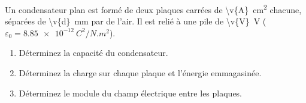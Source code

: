 Un condensateur plan est formé de deux plaques carrées de \qty{\v{A}}{cm^2} chacune, séparées de \qty{\v{d}}{mm} par de l'air. Il est relié à une pile de \qty{\v{V}}{V} ($\varepsilon_0 = \qty{8.85e-12}{C^2/N.m^2}$).

\begin{enumerate}[label=\alph*)]
    \item Déterminez la capacité du condensateur.
    \item Déterminez la charge sur chaque plaque et l'énergie emmagasinée.
    \item Déterminez le module du champ électrique entre les plaques.
\end{enumerate}
